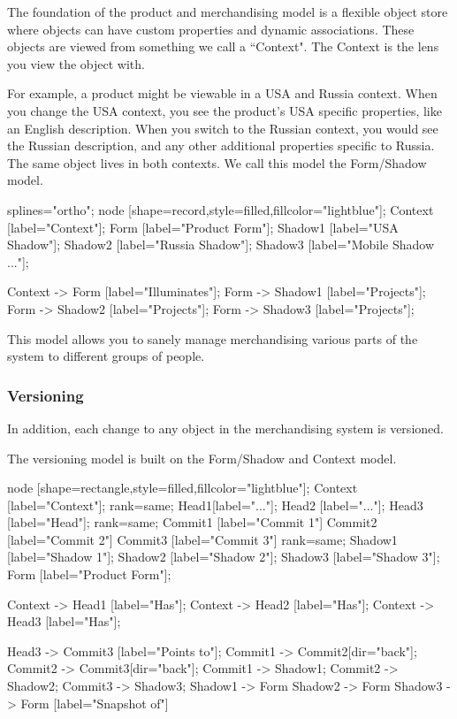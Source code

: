 \documentclass[11pt]{article}
\begin{document}
The foundation of the product and merchandising model is a flexible object store
where objects can have custom properties and dynamic associations. These objects
are viewed from something we call a ``Context". The Context is the lens you
view the object with.

For example, a product might be viewable in a USA and Russia context. When you
change the USA context, you see the product's USA specific properties, like an English
description. When you switch to the Russian context, you would see the Russian description,
and any other additional properties specific to Russia. The same object lives
in both contexts. We call this model the Form/Shadow model.

 {
    splines="ortho";
    node [shape=record,style=filled,fillcolor="lightblue"];
    Context [label="Context"];
    Form [label="Product Form"];
    Shadow1 [label="USA Shadow"];
    Shadow2 [label="Russia Shadow"];
    Shadow3 [label="Mobile Shadow ..."];

    Context -> Form [label="Illuminates"];
    Form -> Shadow1 [label="Projects"];
    Form -> Shadow2 [label="Projects"];
    Form -> Shadow3 [label="Projects"];
}

This model allows you to sanely manage merchandising various parts of the
system to different groups of people.

\subsubsection{Versioning}

In addition, each change to any object in the merchandising system is versioned.

The versioning model is built on the Form/Shadow and Context model. 

 {
    node [shape=rectangle,style=filled,fillcolor="lightblue"];
    Context [label="Context"];
    {
        rank=same;
        Head1[label="..."];
        Head2 [label="..."];
        Head3 [label="Head"];
    }
    {
        rank=same;
        Commit1 [label="Commit 1"]
        Commit2 [label="Commit 2"]
        Commit3 [label="Commit 3"]
    }
    {
        rank=same;
        Shadow1 [label="Shadow 1"];
        Shadow2 [label="Shadow 2"];
        Shadow3 [label="Shadow 3"];
    }
    Form [label="Product Form"];

    Context -> Head1 [label="Has"];
    Context -> Head2 [label="Has"];
    Context -> Head3 [label="Has"];

    Head3 -> Commit3 [label="Points to"];
    Commit1 -> Commit2[dir="back"];
    Commit2 -> Commit3[dir="back"];
    Commit1 -> Shadow1;
    Commit2 -> Shadow2;
    Commit3 -> Shadow3;
    Shadow1 -> Form 
    Shadow2 -> Form 
    Shadow3 -> Form [label="Snapshot of"]
}
\end{document}
